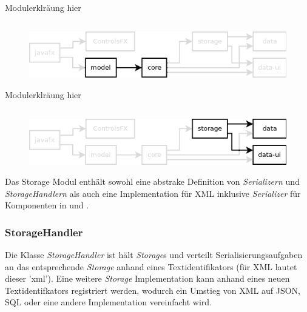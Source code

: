 Modulerklräung hier




\subsection{\textModModel}
\label{\textModModel}
\begin{figure}[hb!]
	\centering
	\includegraphics[width=.8\textwidth]{module_dependencies_model.png}
\end{figure}

Modulerklräung hier




\subsection{\textModStorage}
\label{\textModStorage}
\begin{figure}[hb!]
	\centering
	\includegraphics[width=.8\textwidth]{module_dependencies_storage.png}
\end{figure}

Das Storage Modul enthält sowohl eine abstrake Definition von \textit{Serializern} und \textit{StorageHandlern}
als auch eine Implementation für XML inklusive \textit{Serializer} für Komponenten in  und
.

\subsubsection{StorageHandler}
Die Klasse \textit{StorageHandler} ist hält \textit{Storage}s und verteilt Serialisierungsaufgaben an
das entsprechende \textit{Storage} anhand eines Textidentifikators (für XML lautet dieser 'xml').
Eine weitere \textit{Storage} Implementation kann anhand eines neuen Textidentifkators registriert werden,
wodurch ein Umstieg von XML auf JSON, SQL oder eine andere Implementation vereinfacht wird.


